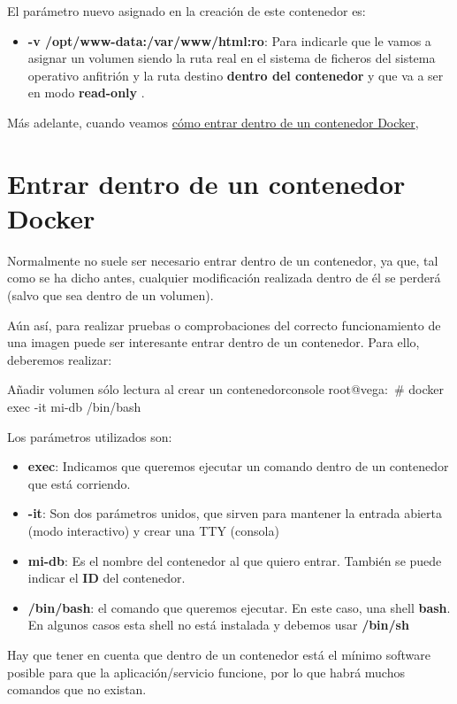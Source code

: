 El parámetro nuevo asignado en la creación de este contenedor es:
\begin{itemize}
    \item \textbf{-v /opt/www-data:/var/www/html:ro}: Para indicarle que le vamos a asignar un volumen siendo la ruta real en el sistema de ficheros del sistema operativo anfitrión  y la ruta destino \textbf{dentro del contenedor} y que va a ser en modo \textbf{read-only} .
\end{itemize}

Más adelante, cuando veamos \hyperlink{entrar_en_contenedor}{cómo entrar dentro de un contenedor Docker},

\hypertarget{entrar_en_contenedor}{}
\section{Entrar dentro de un contenedor Docker}
Normalmente no suele ser necesario entrar dentro de un contenedor, ya que, tal como se ha dicho antes, cualquier modificación realizada dentro de él se perderá (salvo que sea dentro de un volumen).

Aún así, para realizar pruebas o comprobaciones del correcto funcionamiento de una imagen puede ser interesante entrar dentro de un contenedor. Para ello, deberemos realizar:

\begin{mycode}{Añadir volumen sólo lectura al crear un contenedor}{console}{}
root@vega:~# docker exec -it mi-db /bin/bash
\end{mycode}

Los parámetros utilizados son:
\begin{itemize}
    \item \textbf{exec}: Indicamos que queremos ejecutar un comando dentro de un contenedor que está corriendo.
    \item \textbf{-it}: Son dos parámetros unidos, que sirven para mantener la entrada abierta (modo interactivo) y crear una TTY (consola)
    \item \textbf{mi-db}: Es el nombre del contenedor al que quiero entrar. También se puede indicar el \textbf{ID} del contenedor.
    \item \textbf{/bin/bash}: el comando que queremos ejecutar. En este caso, una shell \textbf{bash}. En algunos casos esta shell no está instalada y debemos usar \textbf{/bin/sh}
\end{itemize}

Hay que tener en cuenta que dentro de un contenedor está el mínimo software posible para que la aplicación/servicio funcione, por lo que habrá muchos comandos que no existan.


